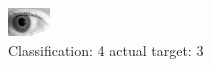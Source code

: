 \begin{figure}[h!]
\begin{center}
\includegraphics[width=0.60\columnwidth]{figures/ID311_class_4_target_3.png}
\end{center}
\caption{ Classification: 4 actual target: 3}
\label{fig:ID311_class_4_target_3}
\end{figure}
